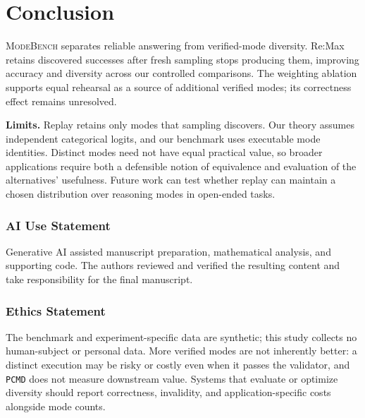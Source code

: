 \documentclass{article}
\newcommand{\1}{\mathbf 1}
\newcommand{\mb}{\textsc{ModeBench}}
\newcommand{\pmd}{\texttt{PCMD}}
\theoremstyle{remark}
\theoremstyle{definition}
\theoremstyle{plain}
\begin{document}
\section{Conclusion}
\label{sec:conclusion}
\label{sec:discussion}
\label{sec:limitations}

\mb{} separates reliable answering from verified-mode diversity. Re:Max retains discovered successes after fresh sampling stops producing them, improving accuracy and diversity across our controlled comparisons. The weighting ablation supports equal rehearsal as a source of additional verified modes; its correctness effect remains unresolved.

\textbf{Limits.} Replay retains only modes that sampling discovers. Our theory assumes independent categorical logits, and our benchmark uses executable mode identities. Distinct modes need not have equal practical value, so broader applications require both a defensible notion of equivalence and evaluation of the alternatives' usefulness. Future work can test whether replay can maintain a chosen distribution over reasoning modes in open-ended tasks.

\label{sec:main-end}
\clearpage
\subsubsection*{AI Use Statement}
\label{sec:ai-use}

Generative AI assisted manuscript preparation, mathematical analysis, and supporting code. The authors reviewed and verified the resulting content and take responsibility for the final manuscript.

\subsubsection*{Ethics Statement}

The benchmark and experiment-specific data are synthetic; this study collects
no human-subject or personal data. More verified modes are not inherently
better: a distinct execution may be risky or costly even when it passes the
validator, and \pmd{} does not measure downstream value. Systems
that evaluate or optimize diversity should report correctness, invalidity, and
application-specific costs alongside mode counts.
\end{document}
